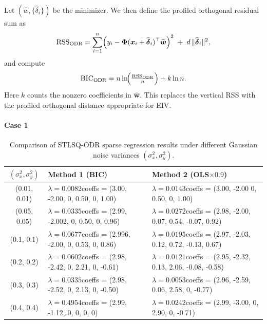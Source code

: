 Let $(\widehat{w},\{\widehat{\delta}_i\})$ be the minimizer. We then define the
profiled orthogonal residual sum as
\[
\mathrm{RSS}_{\text{ODR}}
= \sum_{i=1}^{n}
\Bigl( y_i - \mathbf{\Phi}(\boldsymbol{x}_i+\widehat{\boldsymbol{\delta}}_i)^\top \widehat{\boldsymbol{w}} \Bigr)^2
\;+\; d\,\|\widehat{\boldsymbol{\delta}}_i\|^2 ,
\]
and compute
\[
\mathrm{BIC}_{\text{ODR}}
= n\ln\!\Bigl(\tfrac{\mathrm{RSS}_{\text{ODR}}}{n}\Bigr) + k\ln n.
\]
Here $k$ counts the nonzero coefficients in $\widehat{\boldsymbol{w}}$. This replaces the vertical RSS with the profiled orthogonal distance appropriate for EIV.




\paragraph{Case 1}

\begin{table}
\centering
\caption{Comparison of STLSQ-ODR sparse regression results under different Gaussian noise variances $(\sigma_x^2, \sigma_y^2)$.}
\label{tab:sparse_noise}
\scriptsize
\begin{tabular}{c p{6cm} p{6cm}}
\toprule
$(\sigma_x^2, \sigma_y^2)$ & Method 1 (BIC) & Method 2 (OLS$\times 0.9$) \\
\midrule
(0.01, 0.01) & $\lambda=0.0082$\newline coeffs = (3.00, -2.00, 0, 0.50, 0, 1.00) 
             & $\lambda=0.0143$\newline coeffs = (3.00, -2.00 0, 0.50, 0, 1.00) \\
\midrule
(0.05, 0.05) & $\lambda=0.0335$\newline coeffs = (2.99, -2.002, 0, 0.50, 0, 0.96) 
             & $\lambda=0.0272$\newline coeffs = (2.98, -2.00, 0.07, 0.54, -0.07, 0.92) \\
\midrule
(0.1, 0.1)   & $\lambda=0.0677$\newline coeffs = (2.996, -2.00, 0, 0.53, 0, 0.86) 
             & $\lambda=0.0195$\newline coeffs = (2.97, -2.03, 0.12, 0.72, -0.13, 0.67) \\
\midrule
(0.2, 0.2)   & $\lambda=0.0602$\newline coeffs = (2.98, -2.42, 0, 2.21, 0, -0.61) 
             & $\lambda=0.0121$\newline coeffs = (2.95, -2.32, 0.13, 2.06, -0.08, -0.58) \\
\midrule
(0.3, 0.3)   & $\lambda=0.0335$\newline coeffs = (2.98, -2.52, 0, 2.13, 0, -0.50) 
             & $\lambda=0.0053$\newline coeffs = (2.96, -2.59, 0.06, 2.58, 0, -0.77) \\
\midrule
(0.4, 0.4)   & $\lambda=0.4954$\newline coeffs = (2.99, -1.12, 0, 0, 0, 0) 
             & $\lambda=0.0242$\newline coeffs = (2.99, -3.00, 0, 2.90, 0, -0.71) \\
\bottomrule
\end{tabular}
\end{table}

